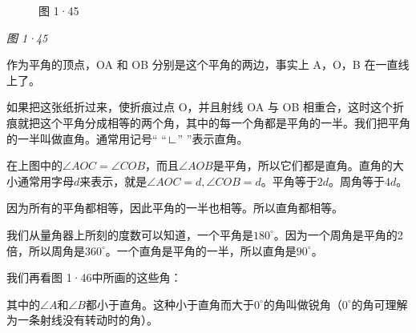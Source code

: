 \begin{figure}
\centering
{}
\caption{图 1·45}
\end{figure}

\emph{图 1·45}

作为平角的顶点，OA 和 OB 分别是这个平角的两边，事实上 A，O，B
在一直线上了。

如果把这张纸折过来，使折痕过点 O，并且射线 OA 与 OB
相重合，这时这个折痕就把这个平角分成相等的两个角，其中的每一个角都是平角的一半。我们把平角的一半叫做直角。通常用记号``
``∟'' ''表示直角。

在上图中的\(\angle AOC = \angle COB\)，而且\(\angle AOB\)是平角，所以它们都是直角。直角的大小通常用字母\(d\)来表示，就是\(\angle AOC = d, \angle COB = d\)。平角等于\(2d\)。周角等于\(4d\)。

因为所有的平角都相等，因此平角的一半也相等。所以直角都相等。

我们从量角器上所刻的度数可以知道，一个平角是\(180^{\circ}\)。因为一个周角是平角的2倍，所以周角是\(360^{\circ}\)。一个直角是平角的一半，所以直角是\(90^{\circ}\)。

我们再看图 1·46中所画的这些角：

其中的\(\angle A\)和\(\angle B\)都小于直角。这种小于直角而大于\(0^{\circ}\)的角叫做锐角（\(0^{\circ}\)的角可理解为一条射线没有转动时的角）。


